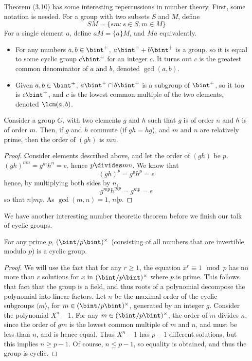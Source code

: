 Theorem (3.10) has some interesting repercussions in number theory. First, some notation is needed. For a group with two subsets $S$ and $M$, define
%
\[ SM = \{ sm : s \in S, m \in M \} \]
%
For a single element $a$, define $aM = \{ a \}M$, and $Ma$ equivalently.
\begin{itemize}
    \item For any numbers $a, b \in \bint^+$, $a\bint^+ + b\bint^+$ is a group. so it is equal to some cyclic group $c\bint^+$ for an integer $c$. It turns out $c$ is the greatest common denominator  of $a$ and $b$, denoted $\gcd(a,b)$.
    \item Given $a,b \in \bint^+$, $a\bint^+ \cap b\bint^+$ is a subgroup of $\bint^+$, so it too is $c\bint^+$, and $c$ is the lowest common multiple  of the two elements, denoted $\lcm(a,b)$.
\end{itemize}

\begin{theorem}
    Consider a group $G$, with two elements $g$ and $h$ such that $g$ is of order $n$ and $h$ is of order $m$. Then, if $g$ and $h$ commute (if $gh = hg$), and $m$ and $n$ are relatively prime, then the order of $(gh)$ is $mn$.
\end{theorem}
\begin{proof}
    Consider elements described above, and let the order of $(gh)$ be $p$. $(gh)^{mn} = g^mh^n = e$, hence $p \divides mn$. We know that
    \[ (gh)^p = g^ph^p = e \]
    hence, by multiplying both sides by $n$,
    \[ g^{mp}h^{mp} = g^{mp} = e \]
    so that $n | mp$. As $\gcd(m,n) = 1$, $n | p$.
\end{proof}

We have another interesting number theoretic theorem before we finish our talk of cyclic groups.

\begin{theorem}
    For any prime $p$, $(\bint/p\bint)^\times$ (consisting of all numbers that are invertible modulo $p$) is a cyclic group.
\end{theorem}
\begin{proof}
    We will use the fact that for any $r \geq 1$, the equation $x^r \equiv 1 \mod{p}$ has no more than $r$ solutions for $x$ in $(\bint/p\bint)^\times$ where $p$ is prime. This follows that fact that the group is a field, and thus roots of a polynomial decompose the polynomial into linear factors. Let $n$ be the maximal order of the cyclic subgroups $\langle m \rangle$, for $m \in (\bint/p\bint)^\times$, generated by an integer $g$. Consider the polynomial $X^n - 1$. For any $m \in (\bint/p\bint)^\times$, the order of $m$ divides $n$, since the order of $gm$ is the lowest common multiple of $m$ and $n$, and must be less than $n$, and is hence equal. Thus $X^n - 1$ has $p - 1$ different solutions, but this implies $n \geq p - 1$. Of course, $n \leq p - 1$, so equality is obtained, and thus the group is cyclic.
\end{proof}

